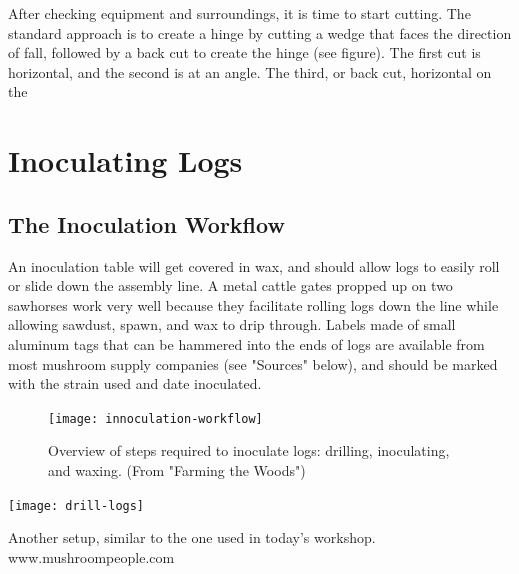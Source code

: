 \documentclass{tufte-handout}
\begin{document}
After checking equipment and surroundings, it is time to start cutting.
The standard approach is to create a hinge by cutting a wedge that faces the direction of fall, followed by a back cut to create the hinge (see figure). The first cut is horizontal, and the second is at an angle. The third, or back cut, horizontal on the 

\section{Inoculating Logs}



\subsection{The Inoculation Workflow}

An inoculation table will get covered in wax, and should allow logs to easily roll or slide down the assembly line. 
A metal cattle gates propped up on two
sawhorses work very well because they
facilitate rolling logs down the line while
allowing sawdust, spawn, and wax to drip
through. 
Labels made of small aluminum tags that can be hammered into the ends of logs are available from most mushroom supply companies (see "Sources" below), and should be marked with the strain used and date inoculated.


\begin{figure}
\texttt{[image: innoculation-workflow]}
\caption{Overview of steps required to inoculate logs: drilling, inoculating, and waxing. (From "Farming the Woods")}
\end{figure}

\begin{marginfigure}
\texttt{[image: drill-logs]}
\caption{Another setup, similar to the one  used in today's workshop. www.mushroompeople.com}
\end{marginfigure}
\end{document}
